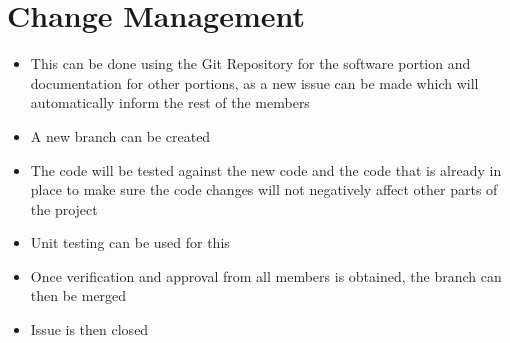 \documentclass{article}
\begin{document}
	\section{Change Management}
	\begin{itemize}
	    \item This can be done using the Git Repository for the software portion and documentation for other portions, as a new issue can be made which will automatically inform the rest of the members
	    \item A new branch can be created
	    \item The code will be tested against the new code and the code that is already in place to make sure the code changes will not negatively affect other parts of the project
	    \item Unit testing can be used for this
	    \item Once verification and approval from all members is obtained, the branch can then be merged
	    \item Issue is then closed 
	\end{itemize}
\end{document}
